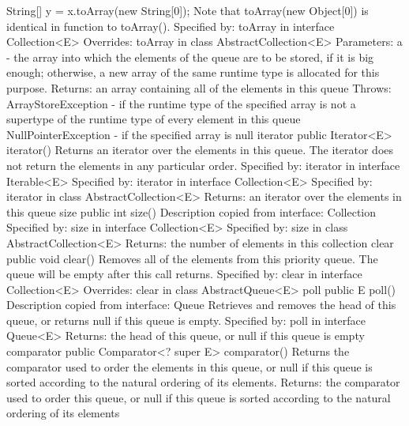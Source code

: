 \documentclass{book}
\begin{document}
String[] y = x.toArray(new String[0]);
Note that toArray(new Object[0]) is identical in function to toArray().
Specified by:
toArray in interface Collection<E>
Overrides:
toArray in class AbstractCollection<E>
Parameters:
a - the array into which the elements of the queue are to be stored, if it is big enough; otherwise, a new array of the same runtime type is allocated for this purpose.
Returns:
an array containing all of the elements in this queue
Throws:
ArrayStoreException - if the runtime type of the specified array is not a supertype of the runtime type of every element in this queue
NullPointerException - if the specified array is null
iterator
public Iterator<E> iterator()
Returns an iterator over the elements in this queue. The iterator does not return the elements in any particular order.
Specified by:
iterator in interface Iterable<E>
Specified by:
iterator in interface Collection<E>
Specified by:
iterator in class AbstractCollection<E>
Returns:
an iterator over the elements in this queue
size
public int size()
Description copied from interface: Collection
Specified by:
size in interface Collection<E>
Specified by:
size in class AbstractCollection<E>
Returns:
the number of elements in this collection
clear
public void clear()
Removes all of the elements from this priority queue. The queue will be empty after this call returns.
Specified by:
clear in interface Collection<E>
Overrides:
clear in class AbstractQueue<E>
poll
public E poll()
Description copied from interface: Queue
Retrieves and removes the head of this queue, or returns null if this queue is empty.
Specified by:
poll in interface Queue<E>
Returns:
the head of this queue, or null if this queue is empty
comparator
public Comparator<? super E> comparator()
Returns the comparator used to order the elements in this queue, or null if this queue is sorted according to the natural ordering of its elements.
Returns:
the comparator used to order this queue, or null if this queue is sorted according to the natural ordering of its elements
\end{document}
